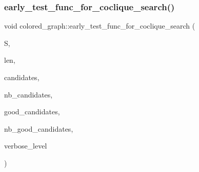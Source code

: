 \subsubsection{\texorpdfstring{early\+\_\+test\+\_\+func\+\_\+for\+\_\+coclique\+\_\+search()}{early\_test\_func\_for\_coclique\_search()}}
{\footnotesize\ttfamily void colored\+\_\+graph\+::early\+\_\+test\+\_\+func\+\_\+for\+\_\+coclique\+\_\+search (\begin{DoxyParamCaption}\item[{\mbox{\hyperlink{galois_8h_a09fddde158a3a20bd2dcadb609de11dc}{I\+NT}} $\ast$}]{S,  }\item[{\mbox{\hyperlink{galois_8h_a09fddde158a3a20bd2dcadb609de11dc}{I\+NT}}}]{len,  }\item[{\mbox{\hyperlink{galois_8h_a09fddde158a3a20bd2dcadb609de11dc}{I\+NT}} $\ast$}]{candidates,  }\item[{\mbox{\hyperlink{galois_8h_a09fddde158a3a20bd2dcadb609de11dc}{I\+NT}}}]{nb\+\_\+candidates,  }\item[{\mbox{\hyperlink{galois_8h_a09fddde158a3a20bd2dcadb609de11dc}{I\+NT}} $\ast$}]{good\+\_\+candidates,  }\item[{\mbox{\hyperlink{galois_8h_a09fddde158a3a20bd2dcadb609de11dc}{I\+NT}} \&}]{nb\+\_\+good\+\_\+candidates,  }\item[{\mbox{\hyperlink{galois_8h_a09fddde158a3a20bd2dcadb609de11dc}{I\+NT}}}]{verbose\+\_\+level }\end{DoxyParamCaption})}

\mbox{\label{classcolored__graph_ac770bb4447ee749f22d84f3d1cc8bdda}} 
